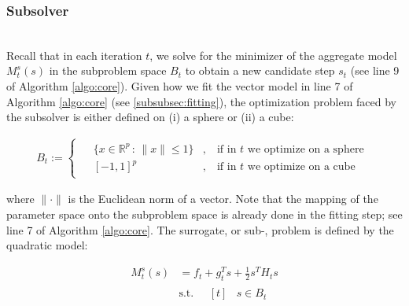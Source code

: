 \subsubsection{Subsolver}
\label{subsubsec:subsolver}
\hfill\\

\noindent Recall that in each iteration $t$, we solve for the minimizer of the aggregate model $M_{t}^{s} (s)$ in the subproblem space $B_t$ to obtain a new candidate step $s_t$ (see line 9 of Algorithm \ref{algo:core}).
Given how we fit the vector model in line 7 of Algorithm \ref{algo:core} (see \ref{subsubsec:fitting}), the optimization problem faced by the subsolver is either defined on (i) a sphere or (ii) a cube:


\begin{align}
    B_t := \begin{cases}
    \begin{aligned}
        & \{x \in \mathbb{R}^p \, : \, \lVert x \rVert \leq 1 \} & , \ & \text{if  in $t$ we optimize on a sphere} \\
        & [-1, 1]^p & , \ & \text{if in $t$ we optimize on a cube}
    \end{aligned}
    \end{cases}
    \label{eq:ball-metric}
\end{align}

\noindent where $\lVert\cdot\rVert$ is the Euclidean norm of a vector.
Note that the mapping of the parameter space onto the subproblem space is already done in the fitting step; see line 7 of Algorithm \ref{algo:core}.
The surrogate, or sub-, problem is defined by the quadratic model:

\begin{align}
    M_{t}^{s} (s) &= f_t + g_t^T s + \frac{1}{2} s^T H_t s \\
    &\text{s.t.} \quad \begin{aligned}[t]
        & s \in B_t
    \end{aligned}
    \label{eq:quad-subproblem}
\end{align}


